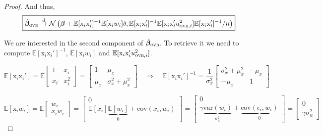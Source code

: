 \documentclass[a4paper, 11pt]{report}
\begin{document}
\begin{proof}
				And thus,
				~
				\begin{equation}\label{asympt_ovb}
					\boxed{
						\hat{\bm{\beta}}_{\textsc{ovb}} \overset{d}{\to} \mathcal{N}\left( \bm{\beta} + \mathbb{E}[\text{x}_{i}\text{x}_{i}']^{-1} \mathbb{E}[\text{x}_{i} w_{i}] \delta ,  \mathbb{E}[\text{x}_{i}\text{x}_{i}']^{-1} \mathbb{E}[\text{x}_{i}\text{x}_{i}'u_{\textsc{ovb}, i}^{2}] \mathbb{E}[\text{x}_{i}\text{x}_{i}']^{-1} / n \right) 
					}
				\end{equation}
				
				We are interested in the second component of $\hat{\bm{\beta}}_{\textsc{ovb}}$. To retrieve it we need to compute $\mathbb{E}[\text{x}_{i}\text{x}_{i}']^{-1}$, $ \mathbb{E}[\text{x}_{i} w_{i}] $ and $\mathbb{E}[\text{x}_{i}\text{x}_{i}'u_{\textsc{ovb}, i}^{2}]$.  
				
				\[ 
				\mathbb{E}[\text{x}_{i}\text{x}_i'] 
				= \mathbb{E} \begin{bmatrix}
					1 & x_{i}\\ 
					x_{i} & x_{i}^{2}
				\end{bmatrix} 
				=
				\begin{bmatrix}
					1 & \mu_{x}\\ 
					\mu_{x} & \sigma_{x}^{2} + \mu_{x}^2
				\end{bmatrix} 
				\quad \Rightarrow \quad
				     \mathbb{E}[\text{x}_{i}\text{x}_i']^{-1} = \dfrac{1}{\sigma_{x}^{2}} 
				     									\begin{bmatrix}
														 \sigma_{x}^{2} + \mu_{x}^2 & -\mu_{x}\\ 
														-\mu_{x} & 1
													\end{bmatrix} 
				\]
				
				\begin{equation*} 
            				\mathbb{E}[\text{x}_{i}w_i] = 
            				\mathbb{E}
            					\begin{bmatrix}
            						w_i\\ 
            						x_iw_i
            					\end{bmatrix} 
            				=
            				\begin{bmatrix}
            				    	0\\ 
            					\mathbb{E}[x_{i}]\underbrace{\mathbb{E}[w_{i}]}_{0} + \text{cov}(x_{i}, w_{i}) 
            				\end{bmatrix} 
            				= 
            				\begin{bmatrix}
            				    	0\\ 
            					\gamma  \underbrace{\text{var}(w_{i})}_{\sigma_{w}^{2}} + \underbrace{\text{cov}(\epsilon_{i}, w_{i})}_{0} 
            				\end{bmatrix} 
            				=
            				\begin{bmatrix}
            				    	0\\ 
            					\gamma \sigma_{w}^{2}
            				\end{bmatrix} 
				\end{equation*}
				

\end{proof}
\end{document}
